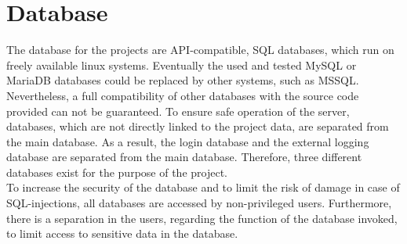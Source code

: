 
\section{Database}

The database for the projects are API-compatible, SQL databases, which run on freely available linux systems. Eventually the used and tested MySQL or MariaDB databases could be 
replaced by other systems, such as MSSQL. Nevertheless, a full compatibility of other databases with the source code provided can not be guaranteed. To ensure safe operation of the
server, databases, which are not directly linked to the project data, are separated from the main database. As a result, the login database and the external logging database are 
separated from the main database. Therefore, three different databases exist for the purpose of the project.\\ 
To increase the security of the database and to limit the risk of damage in case of SQL-injections, all databases are accessed by non-privileged users. Furthermore, there is a 
separation in the users, regarding the function of the database invoked, to limit access to sensitive data in the database.